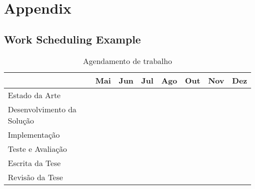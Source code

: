 
\section{Appendix} %
\label{sec:attachments}

\subsection{Work Scheduling Example} %
\label{sub:work_scheduling}
\begin{table}[H]
  \caption{Agendamento de trabalho}
  \label{sub:work_scheduling}
  \label{tab:worktable}
  \begin{center}
    \begin{tabular}{|l||c|c|c|c|c|c|c|}
    \hline
       & \textbf{Mai} & \textbf{Jun} & \textbf{Jul} & \textbf{Ago} & \textbf{Out} & \textbf{Nov} & \textbf{Dez}\\
    \hline
    \hline
      Estado da Arte & \cellcolor{black!25} & \cellcolor{black!25} &   &   &   &  &  \\
    \hline
      Desenvolvimento da Solução & \cellcolor{black!25} & \cellcolor{black!25} &   &   &   &   &  \\
    \hline
      Implementação &  & \cellcolor{black!25} & \cellcolor{black!25} & \cellcolor{black!25} &   &   &  \\
    \hline
      Teste e Avaliação &  &  &   & \cellcolor{black!25} & \cellcolor{black!25} &   &  \\
    \hline
      Escrita da Tese & \cellcolor{black!25} & \cellcolor{black!25} & \cellcolor{black!25} & \cellcolor{black!25}  & \cellcolor{black!25} & \cellcolor{black!25} & \cellcolor{black!25} \\
    \hline
      Revisão da Tese &  &  &   &   &  & \cellcolor{black!25} & \cellcolor{black!25} \\
    \hline
    \end{tabular}
  \end{center}
\end{table}